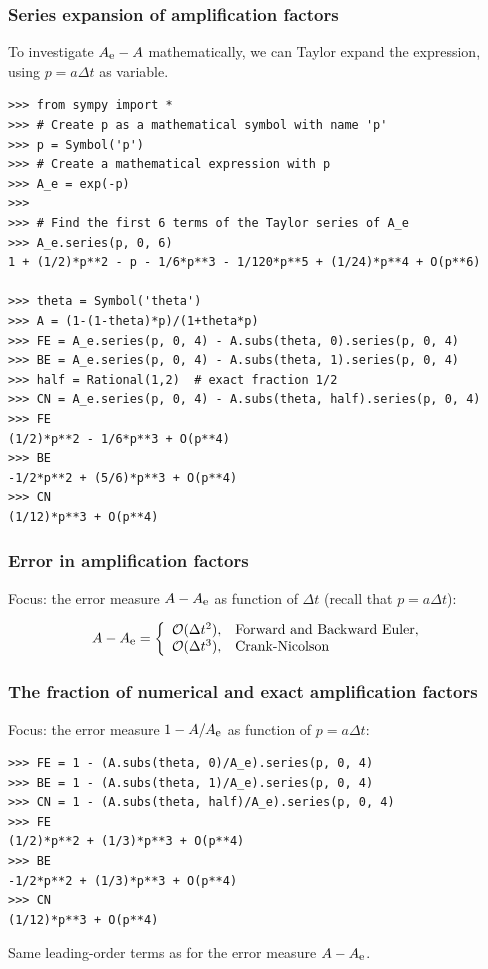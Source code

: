\documentclass{beamer}
\begin{document}
\begin{frame}
\frametitle{Series expansion of amplification factors}

To investigate $\Aex - A$ mathematically, we
can Taylor expand the expression, using $p=a\Delta t$ as variable.

\begin{verbatim}
>>> from sympy import *
>>> # Create p as a mathematical symbol with name 'p'
>>> p = Symbol('p')
>>> # Create a mathematical expression with p
>>> A_e = exp(-p)
>>>
>>> # Find the first 6 terms of the Taylor series of A_e
>>> A_e.series(p, 0, 6)
1 + (1/2)*p**2 - p - 1/6*p**3 - 1/120*p**5 + (1/24)*p**4 + O(p**6)

>>> theta = Symbol('theta')
>>> A = (1-(1-theta)*p)/(1+theta*p)
>>> FE = A_e.series(p, 0, 4) - A.subs(theta, 0).series(p, 0, 4)
>>> BE = A_e.series(p, 0, 4) - A.subs(theta, 1).series(p, 0, 4)
>>> half = Rational(1,2)  # exact fraction 1/2
>>> CN = A_e.series(p, 0, 4) - A.subs(theta, half).series(p, 0, 4)
>>> FE
(1/2)*p**2 - 1/6*p**3 + O(p**4)
>>> BE
-1/2*p**2 + (5/6)*p**3 + O(p**4)
>>> CN
(1/12)*p**3 + O(p**4)
\end{verbatim}
\end{frame}

\begin{frame}
\frametitle{Error in amplification factors}

Focus: the error measure $A-\Aex$ as function of $\Delta t$ (recall that $p=a\Delta t$):

\begin{equation}
A-\Aex = \left\lbrace\begin{array}{ll}
\Oof{\Delta t^2}, & \hbox{Forward and Backward Euler},\\ 
\Oof{\Delta t^3}, & \hbox{Crank-Nicolson}
\end{array}\right.
\end{equation}
\end{frame}

\begin{frame}
\frametitle{The fraction of numerical and exact amplification factors}

Focus: the error measure $1-A/\Aex$ as function of $p=a\Delta t$:

\begin{verbatim}
>>> FE = 1 - (A.subs(theta, 0)/A_e).series(p, 0, 4)
>>> BE = 1 - (A.subs(theta, 1)/A_e).series(p, 0, 4)
>>> CN = 1 - (A.subs(theta, half)/A_e).series(p, 0, 4)
>>> FE
(1/2)*p**2 + (1/3)*p**3 + O(p**4)
>>> BE
-1/2*p**2 + (1/3)*p**3 + O(p**4)
>>> CN
(1/12)*p**3 + O(p**4)
\end{verbatim}
Same leading-order terms as for the error measure $A-\Aex$.
\end{frame}
\end{document}
